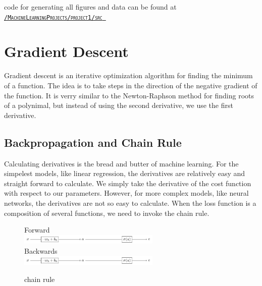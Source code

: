 \documentclass[twoside,11pt]{report}
\begin{document}
\begin{center}
    \scriptsize code for generating all figures and data can be found at 
    \href{https://github.com/bragewiseth/MachineLearningProjects/tree/main/project1/src}{\tt \textsc{/MachineLearningProjects/project1/src} }
\end{center}




\section{Gradient Descent}
\label{sec:GD}

Gradient descent is an iterative optimization algorithm for finding the minimum of a function.
The idea is to take steps in the direction of the negative gradient of the function. It is
verry similar to the Newton-Raphson method for finding roots of a polynimal,
but instead of using the second derivative, we use the first derivative.


\subsection{Backpropagation and Chain Rule}
\label{sec:backpropagation}

Calculating derivatives is the bread and butter of machine learning. For the simpelest models, like linear regression,
the derivatives are relatively easy and straight forward to calculate. We simply take the derivative of the cost function
with respect to our parameters. However, for more complex models, like neural networks, the derivatives are not so easy to calculate.
When the loss function is a composition of several functions, we need to invoke the chain rule. 

\begin{figure}[!h]
    \begin{center}
        Forward\\
        \includegraphics[width=0.6\textwidth]{tikzfigures/forward.pdf}\\
        Backwards\\
        \includegraphics[width=0.6\textwidth]{tikzfigures/backwards.pdf}
    \end{center}
    \caption{chain rule}\label{fig:chainrule}
\end{figure}
\end{document}
